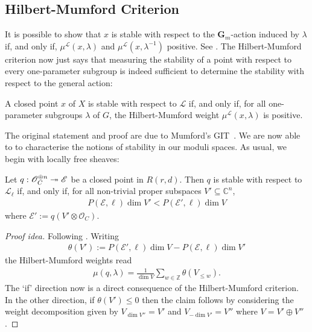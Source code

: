 \documentclass[12pt]{ociamthesis}  %
\begin{document}
\subsection{Hilbert-Mumford Criterion}

It is possible to show that $x$ is stable with
respect to the $\mathbf G_m$-action induced by $\lambda$ if, and only
if, $\mu^{\mathscr L}(x,\lambda)$ and $\mu^{\mathscr L}(x,\lambda^{-1})$
positive.
See \cite[Lemma 6.9]{hoskins2016}.
The Hilbert-Mumford criterion now just says that measuring the
stability of a point with respect to every one-parameter subgroup
is indeed sufficient to determine the stability with respect to the
general action:

\begin{theorem}
  A closed point $x$ of $X$ is stable with
  respect to $\mathscr L$ if, and only if, for all one-parameter
  subgroups $\lambda$ of $G$, the Hilbert-Mumford weight
  $\mu^{\mathscr L}(x,\lambda)$ is positive.
\end{theorem}

The original statement and proof are due to Mumford's GIT~\cite{mumford1963}.
We are now able to to characterise the notions of stability
in our moduli spaces. As usual, we begin with locally free sheaves:

\begin{example}\label{ex:lf_git_stability}
  Let $q : \mathscr O^{\oplus n}_C \twoheadrightarrow \mathscr E$ be a closed point
  in $R(r,d)$. Then $q$ is stable with respect to $\mathscr L_\ell$
  if, and only if, for all non-trivial proper subspaces
  $V'\subseteq \mathbb C^n$,
  \begin{align}\label{eq:git_stable_sheaf}
    P(\mathscr E,\ell)\dim V'< P(\mathscr E',\ell)\dim V
  \end{align}
  where $\mathscr E' := q(V'\otimes\mathscr O_C)$.
  \begin{proof}[Proof idea]
    Following \cite[Lemma 4.4.5]{huybrechts2010}. Writing
    \begin{align*}
      \theta(V') := P(\mathscr E',\ell)\dim V-P(\mathscr E,\ell)\dim V'
    \end{align*}
    the Hilbert-Mumford weights read
    \begin{align*}
      \mu(q,\lambda) = \frac{1}{\dim V}\sum_{w\in\mathbb Z} \theta(V_{\leq w}).
    \end{align*}
    The `if' direction now is a direct consequence of the Hilbert-Mumford
    criterion. In the other direction, if $\theta(V')\leq 0$ then the
    claim follows by considering the weight decomposition given by
    $V_{\dim V''} = V'$ and $V_{-\dim V'} = V''$
    where $V = V' \oplus V''$.
  \end{proof}
\end{example}
\end{document}
